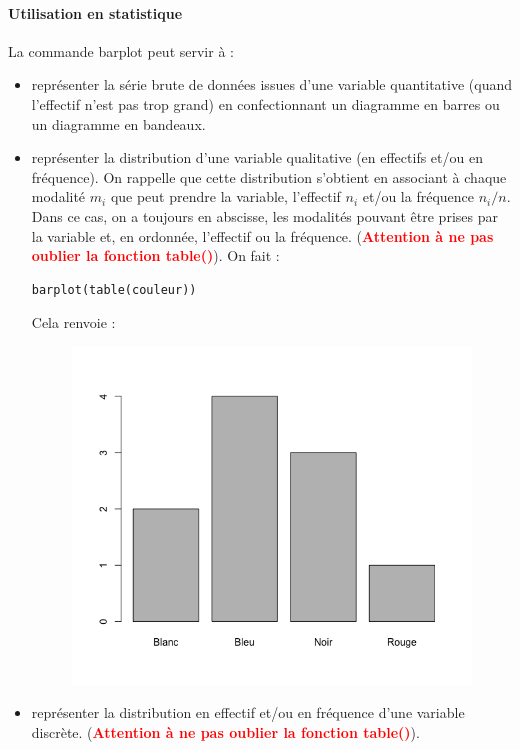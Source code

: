 \paragraph{Utilisation en statistique}
La commande barplot peut servir à :
\begin{itemize}
\item représenter la série brute de données issues d'une variable quantitative (quand l'effectif n'est pas trop grand) en confectionnant un diagramme en barres ou un diagramme en bandeaux.
\item représenter la distribution d'une variable qualitative (en effectifs et/ou en fréquence). On rappelle que cette distribution s'obtient en associant à chaque modalité $m_{i}$ que peut prendre la variable, l'effectif $n_{i}$ et/ou la fréquence $n_{i}/n$. Dans ce cas, on a toujours en abscisse, les modalités pouvant être prises par la variable et, en ordonnée, l'effectif ou la fréquence. (\textbf{\textcolor{red}{Attention à ne pas oublier la fonction table()}}).\newline
On fait :
\begin{lstlisting}[language=html]
barplot(table(couleur))
\end{lstlisting}
Cela renvoie :
\begin{figure}[H]\begin{center}\includegraphics[scale=0.4]{ilu/gra31.png}\end{center}\end{figure}
\item représenter la distribution en effectif et/ou en fréquence d'une variable discrète. (\textbf{\textcolor{red}{Attention à ne pas oublier la fonction table()}}).\newline

\end{itemize}
